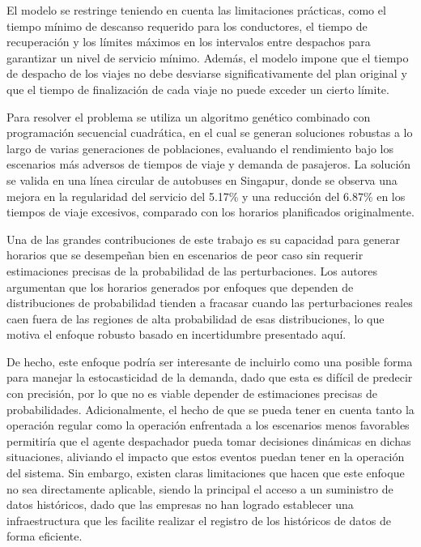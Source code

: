 \documentclass[preprint,11pt]{elsarticle}
\begin{document}
El modelo se restringe teniendo en cuenta las limitaciones prácticas, como el tiempo mínimo de descanso requerido para los conductores, el tiempo de recuperación y los límites máximos en los intervalos entre despachos para garantizar un nivel de servicio mínimo. Además, el modelo impone que el tiempo de despacho de los viajes no debe desviarse significativamente del plan original y que el tiempo de finalización de cada viaje no puede exceder un cierto límite.

Para resolver el problema se utiliza un algoritmo genético combinado con programación secuencial cuadrática, en el cual se generan soluciones robustas a lo largo de varias generaciones de poblaciones, evaluando el rendimiento bajo los escenarios más adversos de tiempos de viaje y demanda de pasajeros. La solución se valida en una línea circular de autobuses en Singapur, donde se observa una mejora en la regularidad del servicio del 5.17\% y una reducción del 6.87\% en los tiempos de viaje excesivos, comparado con los horarios planificados originalmente.

Una de las grandes contribuciones de este trabajo es su capacidad para generar horarios que se desempeñan bien en escenarios de peor caso sin requerir estimaciones precisas de la probabilidad de las perturbaciones. Los autores argumentan que los horarios generados por enfoques que dependen de distribuciones de probabilidad tienden a fracasar cuando las perturbaciones reales caen fuera de las regiones de alta probabilidad de esas distribuciones, lo que motiva el enfoque robusto basado en incertidumbre presentado aquí.

De hecho, este enfoque podría ser interesante de incluirlo como una posible forma para manejar la estocasticidad de la demanda, dado que esta es difícil de predecir con precisión, por lo que no es viable depender de estimaciones precisas de probabilidades. Adicionalmente, el hecho de que se pueda tener en cuenta tanto la operación regular como la operación enfrentada a los escenarios menos favorables permitiría que el agente despachador pueda tomar decisiones dinámicas en dichas situaciones, aliviando el impacto que estos eventos puedan tener en la operación del sistema. Sin embargo, existen claras limitaciones que hacen que este enfoque no sea directamente aplicable, siendo la principal el acceso a un suministro de datos históricos, dado que las empresas no han logrado establecer una infraestructura que les facilite realizar el registro de los históricos de datos de forma eficiente.
\end{document}
